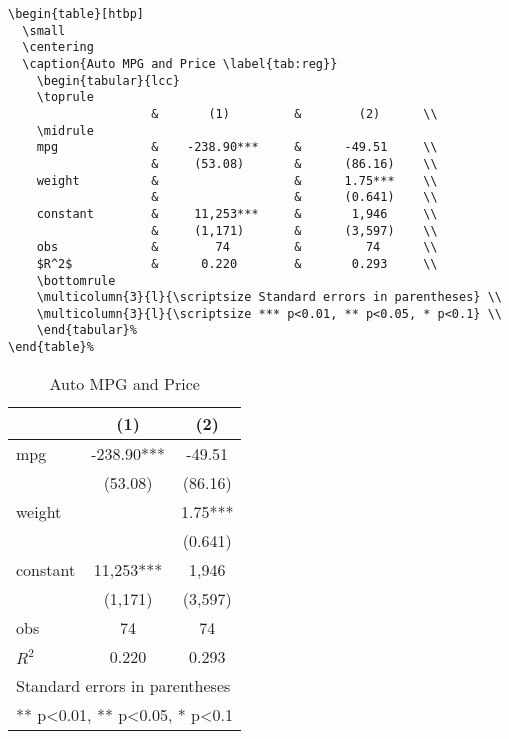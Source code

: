 \documentclass[lang=cn,11pt]{elegantpaper}
\begin{document}
\begin{lstlisting}
\begin{table}[htbp]
  \small
  \centering
  \caption{Auto MPG and Price \label{tab:reg}}
    \begin{tabular}{lcc}
    \toprule
                    &       (1)         &        (2)      \\
    \midrule
    mpg             &    -238.90***     &      -49.51     \\
                    &     (53.08)       &      (86.16)    \\
    weight          &                   &      1.75***    \\
                    &                   &      (0.641)    \\
    constant        &     11,253***     &       1,946     \\
                    &     (1,171)       &      (3,597)    \\
    obs             &        74         &         74      \\
    $R^2$           &      0.220        &       0.293     \\
    \bottomrule
    \multicolumn{3}{l}{\scriptsize Standard errors in parentheses} \\
    \multicolumn{3}{l}{\scriptsize *** p<0.01, ** p<0.05, * p<0.1} \\
    \end{tabular}%
\end{table}%
\end{lstlisting}
\begin{table}[htbp]
  \small
  \centering
  \caption{Auto MPG and Price \label{tab:reg}}
    \begin{tabular}{lcc}
    \toprule
                    &       (1)         &        (2)      \\
    \midrule
    mpg             &    -238.90***     &      -49.51     \\
                    &     (53.08)       &      (86.16)    \\
    weight          &                   &      1.75***    \\
                    &                   &      (0.641)    \\
    constant        &     11,253***     &       1,946     \\
                    &     (1,171)       &      (3,597)   \\
    obs             &        74         &         74     \\
    $R^2$           &      0.220        &       0.293    \\
    \bottomrule
    \multicolumn{3}{l}{\scriptsize Standard errors in parentheses} \\
    \multicolumn{3}{l}{\scriptsize *** p<0.01, ** p<0.05, * p<0.1} \\
    \end{tabular}%
\end{table}%
\end{document}
